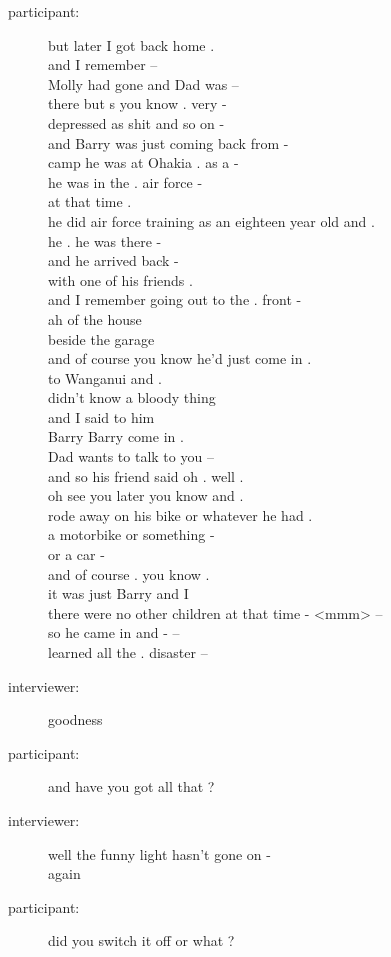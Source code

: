 \documentclass{article}
\newcommand{\turn}[2]{
\item[#1:] #2
}
\begin{document}
\begin{description}
\turn{participant}{but later I got back home .\\
and I remember --\\
Molly had gone and Dad was --\\
there but s you know . very -\\
depressed as shit and so on -\\
and Barry was just coming back from -\\
camp he was at Ohakia . as a -\\
he was in the . air force -\\
at that time .\\
he did air force training as an eighteen year old and .\\
he . he was there -\\
and he arrived back -\\
with one of his friends .\\
and I remember going out to the . front -\\
ah of the house\\
beside the garage\\
and of course you know he'd just come in .\\
to Wanganui and .\\
didn't know a bloody thing\\
and I said to him\\
Barry Barry come in .\\
Dad wants to talk to you --\\
and so his friend said oh . well .\\
oh see you later you know and .\\
rode away on his bike or whatever he had .\\
a motorbike or something -\\
or a car -\\
and of course . you know .\\
it was just Barry and I\\
there were no other children at that time - <mmm> --\\
so he came in and - --\\
learned all the . disaster --}

\turn{interviewer}{goodness}

\turn{participant}{and have you got all that ?}

\turn{interviewer}{ well the funny light hasn't gone on -\\
again}

\turn{participant}{did you switch it off or what ?}


\end{description}
\end{document}
